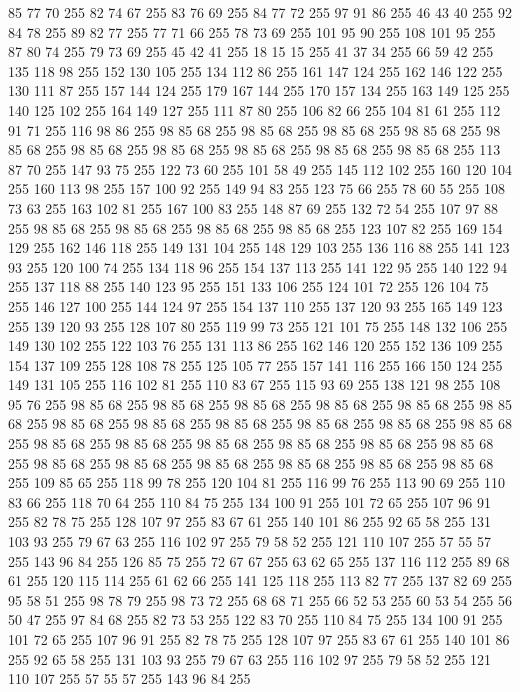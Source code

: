 85 77 70 255 82 74 67 255 83 76 69 255 84 77 72 255 97 91 86 255 46 43 40 255 92 84 78 255 89 82 77 255 77 71 66 255 78 73 69 255 101 95 90 255 108 101 95 255 87 80 74 255 79 73 69 255 45 42 41 255 18 15 15 255 41 37 34 255 66 59 42 255 135 118 98 255 152 130 105 255 134 112 86 255 161 147 124 255 162 146 122 255 130 111 87 255 157 144 124 255 179 167 144 255 170 157 134 255 163 149 125 255 140 125 102 255 164 149 127 255 111 87 80 255 106 82 66 255 104 81 61 255 112 91 71 255 116 98 86 255 98 85 68 255 98 85 68 255 98 85 68 255 98 85 68 255 98 85 68 255 98 85 68 255 98 85 68 255 98 85 68 255 98 85 68 255 98 85 68 255 113 87 70 255 147 93 75 255 122 73 60 255 101 58 49 255 145 112 102 255 160 120 104 255 160 113 98 255 157 100 92 255 149 94 83 255 123 75 66 255 78 60 55 255 108 73 63 255 163 102 81 255 167 100 83 255 148 87 69 255 132 72 54 255 107 97 88 255 98 85 68 255 98 85 68 255
98 85 68 255 98 85 68 255 123 107 82 255 169 154 129 255 162 146 118 255 149 131 104 255 148 129 103 255 136 116 88 255 141 123 93 255 120 100 74 255 134 118 96 255 154 137 113 255 141 122 95 255 140 122 94 255 137 118 88 255 140 123 95 255 151 133 106 255 124 101 72 255 126 104 75 255 146 127 100 255 144 124 97 255 154 137 110 255 137 120 93 255 165 149 123 255 139 120 93 255 128 107 80 255 119 99 73 255 121 101 75 255 148 132 106 255 149 130 102 255 122 103 76 255 131 113 86 255 162 146 120 255 152 136 109 255 154 137 109 255 128 108 78 255 125 105 77 255 157 141 116 255 166 150 124 255 149 131 105 255 116 102 81 255 110 83 67 255 115 93 69 255 138 121 98 255 108 95 76 255 98 85 68 255 98 85 68 255 98 85 68 255 98 85 68 255 98 85 68 255 98 85 68 255 98 85 68 255 98 85 68 255 98 85 68 255 98 85 68 255 98 85 68 255 98 85 68 255 98 85 68 255 98 85 68 255 98 85 68 255 98 85 68 255 98 85 68 255 98 85 68 255 98 85 68 255
98 85 68 255 98 85 68 255 98 85 68 255 98 85 68 255 98 85 68 255 109 85 65 255 118 99 78 255 120 104 81 255 116 99 76 255 113 90 69 255 110 83 66 255 118 70 64 255 110 84 75 255 134 100 91 255 101 72 65 255 107 96 91 255 82 78 75 255 128 107 97 255 83 67 61 255 140 101 86 255 92 65 58 255 131 103 93 255 79 67 63 255 116 102 97 255 79 58 52 255 121 110 107 255 57 55 57 255 143 96 84 255 126 85 75 255 72 67 67 255 63 62 65 255 137 116 112 255 89 68 61 255 120 115 114 255 61 62 66 255 141 125 118 255 113 82 77 255 137 82 69 255 95 58 51 255 98 78 79 255 98 73 72 255 68 68 71 255 66 52 53 255 60 53 54 255 56 50 47 255 97 84 68 255 82 73 53 255 122 83 70 255 110 84 75 255 134 100 91 255 101 72 65 255 107 96 91 255 82 78 75 255 128 107 97 255 83 67 61 255 140 101 86 255 92 65 58 255 131 103 93 255 79 67 63 255 116 102 97 255 79 58 52 255 121 110 107 255 57 55 57 255 143 96 84 255
